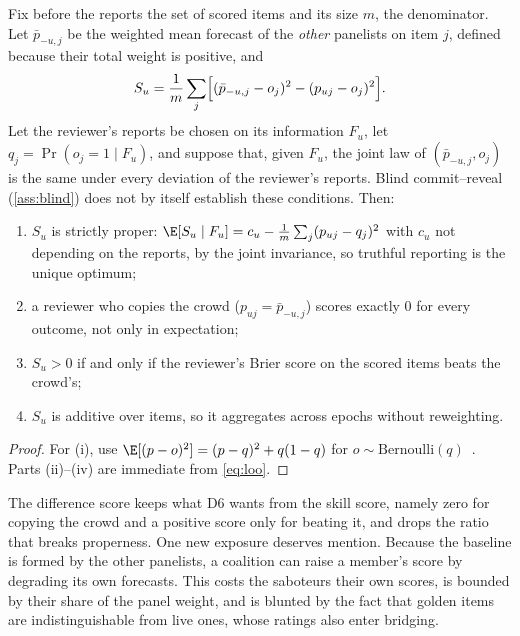 \begin{proposition}\label{prop:loo}\proved{}
Fix before the reports the set of scored items and its size $m$, the denominator. Let
$\bar p_{-u,j}$ be the weighted mean forecast of the \emph{other} panelists on item $j$, defined
because their total weight is positive, and
\begin{equation}\label{eq:loo}
  S_u=\frac1m\sum_{j}\Bigl[(\bar p_{-u,j}-o_j)^2-(p_{uj}-o_j)^2\Bigr].
\end{equation}
Let the reviewer's reports be chosen on its information $F_u$, let $q_j=\Pr(o_j=1\mid F_u)$, and
suppose that, given $F_u$, the joint law of $(\bar p_{-u,j},o_j)$ is the same under every
deviation of the reviewer's reports. Blind commit--reveal (\cref{ass:blind}) does not by itself
establish these conditions. Then:
\begin{enumerate}[label=(\roman*)]
  \item $S_u$ is strictly proper: $\E[S_u\mid F_u]=c_u-\frac1m\sum_j(p_{uj}-q_j)^2$ with $c_u$
    not depending on the reports, by the joint invariance, so truthful reporting is the unique
    optimum;
  \item a reviewer who copies the crowd ($p_{uj}=\bar p_{-u,j}$) scores exactly $0$ for every
    outcome, not only in expectation;
  \item $S_u>0$ if and only if the reviewer's Brier score on the scored items beats the crowd's;
  \item $S_u$ is additive over items, so it aggregates across epochs without reweighting.
\end{enumerate}
\end{proposition}
\begin{proof}
For (i), use $\E[(p-o)^2]=(p-q)^2+q(1-q)$ for $o\sim\mathrm{Bernoulli}(q)$~\cite{gneiting2007scoring}.
Parts (ii)--(iv) are immediate from \eqref{eq:loo}.
\end{proof}

The difference score keeps what D6 wants from the skill score, namely zero for copying the crowd
and a positive score only for beating it, and drops the ratio that breaks properness. One new
exposure deserves mention. Because the baseline is formed by the other panelists, a coalition can
raise a member's score by degrading its own forecasts. This costs the saboteurs their own scores,
is bounded by their share of the panel weight, and is blunted by the fact that golden items are
indistinguishable from live ones, whose ratings also enter bridging.

